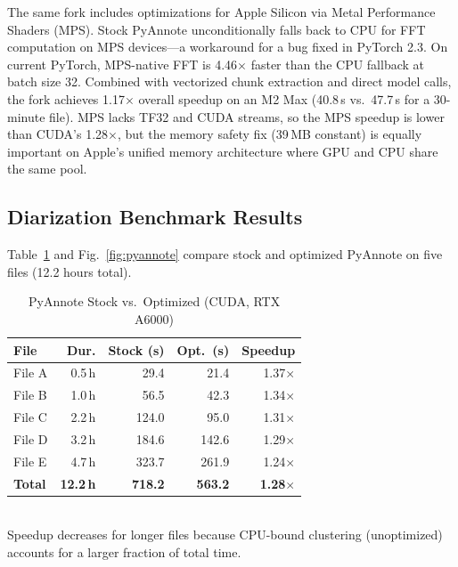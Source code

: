\documentclass[conference,10pt]{IEEEtran}
\begin{document}
The same fork includes optimizations for Apple Silicon via Metal Performance
Shaders (MPS). Stock PyAnnote unconditionally falls back to CPU for FFT
computation on MPS devices---a workaround for a bug fixed in PyTorch 2.3. On
current PyTorch, MPS-native FFT is 4.46$\times$ faster than the CPU fallback
at batch size 32. Combined with vectorized chunk extraction and direct model
calls, the fork achieves 1.17$\times$ overall speedup on an M2 Max (40.8\,s
vs.\ 47.7\,s for a 30-minute file). MPS lacks TF32 and CUDA streams, so the
MPS speedup is lower than CUDA's 1.28$\times$, but the memory safety fix
(39\,MB constant) is equally important on Apple's unified memory architecture
where GPU and CPU share the same pool.

\subsection{Diarization Benchmark Results}

Table~\ref{tab:pyannote} and Fig.~\ref{fig:pyannote} compare stock and optimized
PyAnnote on five files (12.2 hours total).

\begin{table}[!t]
\centering
\caption{PyAnnote Stock vs.\ Optimized (CUDA, RTX A6000)}
\label{tab:pyannote}
\begin{tabular}{@{}lrrrr@{}}
\toprule
\textbf{File} & \textbf{Dur.} & \textbf{Stock (s)} & \textbf{Opt.\ (s)} & \textbf{Speedup} \\
\midrule
File A &  0.5\,h &  29.4 &  21.4 & 1.37$\times$ \\
File B &  1.0\,h &  56.5 &  42.3 & 1.34$\times$ \\
File C &  2.2\,h & 124.0 &  95.0 & 1.31$\times$ \\
File D &  3.2\,h & 184.6 & 142.6 & 1.29$\times$ \\
File E &  4.7\,h & 323.7 & 261.9 & 1.24$\times$ \\
\midrule
\textbf{Total} & \textbf{12.2\,h} & \textbf{718.2} & \textbf{563.2} & \textbf{1.28$\times$} \\
\bottomrule
\end{tabular}
\\[4pt]
{\footnotesize Speedup decreases for longer files because CPU-bound clustering
  (unoptimized) accounts for a larger fraction of total time.}
\end{table}
\end{document}
